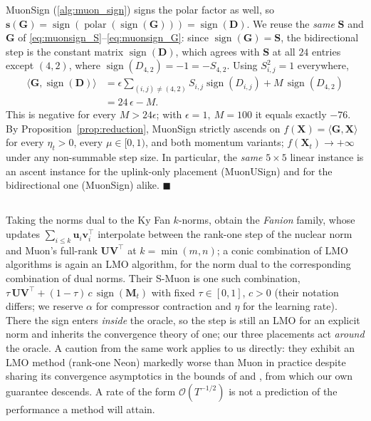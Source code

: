 MuonSign (\cref{alg:muon_sign}) signs the polar factor as well, so $\mathbf{s}(\mathbf{G})=\operatorname{sign}(\operatorname{polar}(\operatorname{sign}(\mathbf{G})))=\operatorname{sign}(\mathbf{D})$. We reuse the \emph{same} $\mathbf{S}$ and $\mathbf{G}$ of \eqref{eq:muonsign_S}--\eqref{eq:muonsign_G}: since $\operatorname{sign}(\mathbf{G})=\mathbf{S}$, the bidirectional step is the constant matrix $\operatorname{sign}(\mathbf{D})$, which agrees with $\mathbf{S}$ at all $24$ entries except $(4,2)$, where $\operatorname{sign}(D_{4,2})=-1=-S_{4,2}$. Using $S_{i,j}^2=1$ everywhere,
\begin{equation}
\begin{aligned}
\langle \mathbf{G}, \operatorname{sign}(\mathbf{D})\rangle
&= \epsilon\!\!\sum_{(i,j)\neq(4,2)}\!\! S_{i,j}\operatorname{sign}(D_{i,j}) + M\,\operatorname{sign}(D_{4,2})\\
&= 24\,\epsilon - M .
\end{aligned}
\end{equation}
This is negative for every $M>24\epsilon$; with $\epsilon=1,\ M=100$ it equals exactly $-76$. By Proposition~\ref{prop:reduction}, MuonSign strictly ascends on $f(\mathbf{X})=\langle\mathbf{G},\mathbf{X}\rangle$ for every $\eta_t>0$, every $\mu\in[0,1)$, and both momentum variants; $f(\mathbf{X}_t)\to+\infty$ under any non-summable step size. In particular, the \emph{same} $5\times5$ linear instance is an ascent instance for the uplink-only placement (MuonUSign) and for the bidirectional one (MuonSign) alike. $\blacksquare$



\subsection{}\label{app:smuon}
Taking the norms dual to the Ky Fan $k$-norms, \citet{kravatskiy2025kyfannorms} obtain the \emph{Fanion} family, whose updates $\sum_{i\le k}\mathbf{u}_i\mathbf{v}_i^\top$ interpolate between the rank-one step of the nuclear norm and Muon's full-rank $\mathbf{U}\mathbf{V}^\top$ at $k=\min(m,n)$; a conic combination of LMO algorithms is again an LMO algorithm, for the norm dual to the corresponding combination of dual norms. Their S-Muon is one such combination, $\tau\,\mathbf{U}\mathbf{V}^\top+(1-\tau)\,c\,\operatorname{sign}(\mathbf{M}_t)$ with fixed $\tau\in[0,1]$, $c>0$ (their notation differs; we reserve $\alpha$ for compressor contraction and $\eta$ for the learning rate). There the sign enters \emph{inside} the oracle, so the step is still an LMO for an explicit norm and inherits the convergence theory of one; our three placements act \emph{around} the oracle. A caution from the same work applies to us directly: they exhibit an LMO method (rank-one Neon) markedly worse than Muon in practice despite sharing its convergence asymptotics in the bounds of \citet{kovalev2025understanding} and \citet{riabinin2025gluon}, from which our own guarantee descends. A rate of the form $\mathcal{O}(T^{-1/2})$ is not a prediction of the performance a method will attain.

